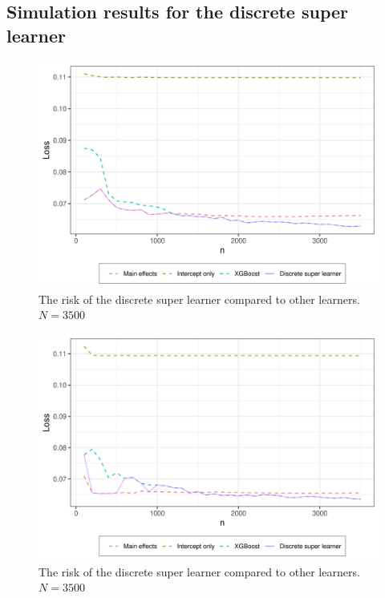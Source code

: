 \documentclass[11pt, a4paper]{article}
\theoremstyle{definition}
\theoremstyle{remark}
\begin{document}
\subsection{Simulation results for the discrete super learner}
\begin{figure}[H]
    \centering
    \includegraphics[width=\textwidth]{figures/dsl_loss.png}
    \caption{The risk of the discrete super learner compared to other learners. $ N = 3500 $} 
    \label{fig:loss_min_of_both}
\end{figure}


\begin{figure}[H]
    \centering
    \includegraphics[width=\textwidth]{figures/dsl_loss_jumps.png}
    \caption{The risk of the discrete super learner compared to other learners. $ N = 3500 $}
    \label{fig:loss_jumps}
\end{figure}
\end{document}

